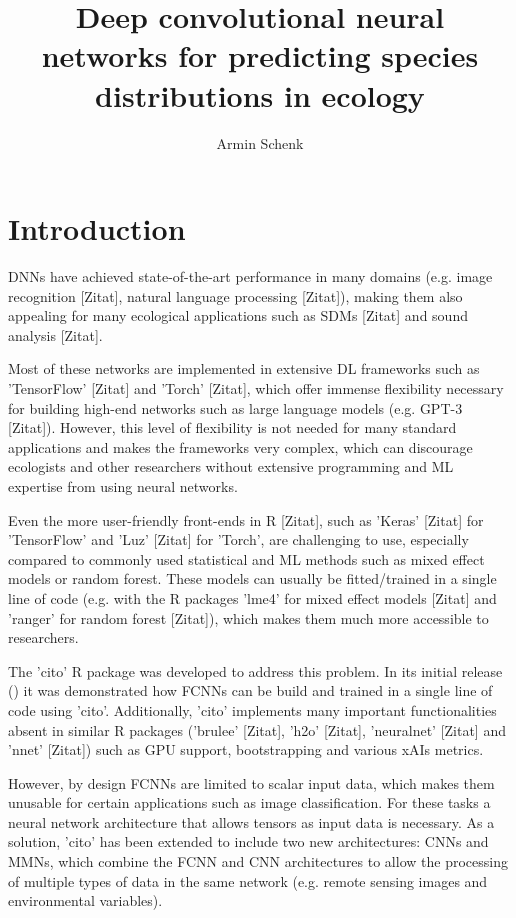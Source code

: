 \documentclass{article}
\author{Armin Schenk}
\title{Deep convolutional neural networks for predicting species distributions in ecology}
\begin{document}
\maketitle

\begin{abstract} 
\end{abstract}

\newpage
\tableofcontents
\newpage
\section{Introduction}
\acp{DNN} have achieved state-of-the-art performance in many domains (e.g. image recognition [Zitat], natural language processing [Zitat]), making them also appealing for many ecological applications such as \acp{SDM} [Zitat] and sound analysis [Zitat].

Most of these networks are implemented in extensive \ac{DL} frameworks such as 'TensorFlow' [Zitat] and 'Torch' [Zitat], which offer immense flexibility necessary for building high-end networks such as large language models (e.g. GPT-3 [Zitat]). However, this level of flexibility is not needed for many standard applications and makes the frameworks very complex, which can discourage ecologists and other researchers without extensive programming and \ac{ML} expertise from using neural networks.

Even the more user-friendly front-ends in R [Zitat], such as 'Keras' [Zitat] for 'TensorFlow' and 'Luz' [Zitat] for 'Torch', are challenging to use, especially compared to commonly used statistical and \ac{ML} methods such as mixed effect models or random forest. These models can usually be fitted/trained in a single line of code (e.g. with the R packages 'lme4' for mixed effect models [Zitat] and 'ranger' for random forest [Zitat]), which makes them much more accessible to researchers.

The 'cito' R package was developed to address this problem. In its initial release (\cite{amesoderCitoPackageTraining2024}) it was demonstrated how \acp{FCNN} can be build and trained in a single line of code using 'cito'. Additionally, 'cito' implements many important functionalities absent in similar R packages ('brulee' [Zitat], 'h2o' [Zitat], 'neuralnet' [Zitat] and 'nnet' [Zitat]) such as GPU support, bootstrapping and various \acp{xAI} metrics.

However, by design \acp{FCNN} are limited to scalar input data, which makes them unusable for certain applications such as image classification. For these tasks a neural network architecture that allows tensors as input data is necessary.
As a solution, 'cito' has been extended to include two new architectures: \acp{CNN} and \acp{MMN}, which combine the \ac{FCNN} and \ac{CNN} architectures to allow the processing of multiple types of data in the same network (e.g. remote sensing images and environmental variables).
\end{document}

